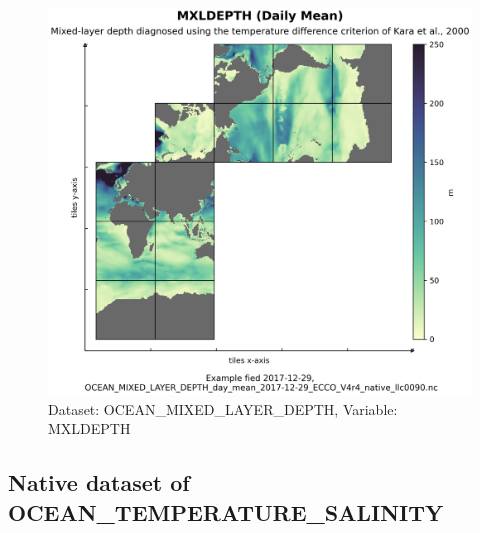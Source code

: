 \begin{figure}[H]
\centering
\includegraphics[scale=0.55]{../images/plots/native_plots/Ocean_Mixed_Layer_Depth/MXLDEPTH.png}
\caption{Dataset: OCEAN\_MIXED\_LAYER\_DEPTH, Variable: MXLDEPTH}
\label{tab:table-OCEAN_MIXED_LAYER_DEPTH_MXLDEPTH-Plot}
\end{figure}
\subsection{Native dataset of OCEAN\_TEMPERATURE\_SALINITY}
\newp
